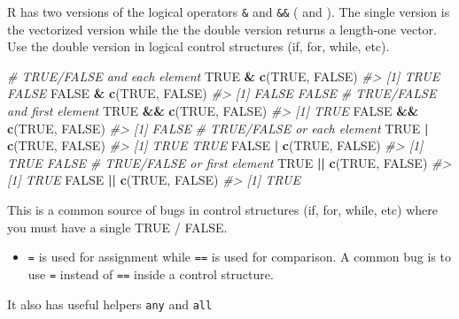 \documentclass[]{book}
\newenvironment{Shaded}{\begin{snugshade}}{\end{snugshade}}
\newcommand{\KeywordTok}[1]{\textcolor[rgb]{0.13,0.29,0.53}{\textbf{#1}}}
\newcommand{\StringTok}[1]{\textcolor[rgb]{0.31,0.60,0.02}{#1}}
\newcommand{\CommentTok}[1]{\textcolor[rgb]{0.56,0.35,0.01}{\textit{#1}}}
\newcommand{\OtherTok}[1]{\textcolor[rgb]{0.56,0.35,0.01}{#1}}
\newcommand{\OperatorTok}[1]{\textcolor[rgb]{0.81,0.36,0.00}{\textbf{#1}}}
\newcommand{\NormalTok}[1]{#1}
\newenvironment{rmdblock}[1]
  {\begin{shaded*}
  \begin{itemize}
  \renewcommand{\labelitemi}{
    \raisebox{-.7\height}[0pt][0pt]{
      {\setkeys{Gin}{width=3em,keepaspectratio}\texttt{[image: images/\#1]}}
    }
  }
  \item
  }
  {
  \end{itemize}
  \end{shaded*}
  }
\newenvironment{rmdcaution}
  {\begin{rmdblock}{caution}}
  {\end{rmdblock}}
\theoremstyle{definition}
\theoremstyle{definition}
\theoremstyle{definition}
\theoremstyle{remark}
\begin{document}
R has two versions of the logical operators \texttt{\&} and
\texttt{\&\&} (\texttt{\textbar{}} and \texttt{\textbar{}\textbar{}}).
The single version is the vectorized version while the the double
version returns a length-one vector. Use the double version in logical
control structures (if, for, while, etc).

\begin{Shaded}
\begin{Highlighting}[]
\CommentTok{# TRUE/FALSE and each element}
\OtherTok{TRUE} \OperatorTok{&}\StringTok{ }\KeywordTok{c}\NormalTok{(}\OtherTok{TRUE}\NormalTok{, }\OtherTok{FALSE}\NormalTok{)}
\CommentTok{#> [1]  TRUE FALSE}
\OtherTok{FALSE} \OperatorTok{&}\StringTok{ }\KeywordTok{c}\NormalTok{(}\OtherTok{TRUE}\NormalTok{, }\OtherTok{FALSE}\NormalTok{)}
\CommentTok{#> [1] FALSE FALSE}
\CommentTok{# TRUE/FALSE and first element}
\OtherTok{TRUE} \OperatorTok{&&}\StringTok{ }\KeywordTok{c}\NormalTok{(}\OtherTok{TRUE}\NormalTok{, }\OtherTok{FALSE}\NormalTok{)}
\CommentTok{#> [1] TRUE}
\OtherTok{FALSE} \OperatorTok{&&}\StringTok{ }\KeywordTok{c}\NormalTok{(}\OtherTok{TRUE}\NormalTok{, }\OtherTok{FALSE}\NormalTok{)}
\CommentTok{#> [1] FALSE}
\CommentTok{# TRUE/FALSE or each element}
\OtherTok{TRUE} \OperatorTok{|}\StringTok{ }\KeywordTok{c}\NormalTok{(}\OtherTok{TRUE}\NormalTok{, }\OtherTok{FALSE}\NormalTok{)}
\CommentTok{#> [1] TRUE TRUE}
\OtherTok{FALSE} \OperatorTok{|}\StringTok{ }\KeywordTok{c}\NormalTok{(}\OtherTok{TRUE}\NormalTok{, }\OtherTok{FALSE}\NormalTok{)}
\CommentTok{#> [1]  TRUE FALSE}
\CommentTok{# TRUE/FALSE or first element}
\OtherTok{TRUE} \OperatorTok{||}\StringTok{ }\KeywordTok{c}\NormalTok{(}\OtherTok{TRUE}\NormalTok{, }\OtherTok{FALSE}\NormalTok{)}
\CommentTok{#> [1] TRUE}
\OtherTok{FALSE} \OperatorTok{||}\StringTok{ }\KeywordTok{c}\NormalTok{(}\OtherTok{TRUE}\NormalTok{, }\OtherTok{FALSE}\NormalTok{)}
\CommentTok{#> [1] TRUE}
\end{Highlighting}
\end{Shaded}

This is a common source of bugs in control structures (if, for, while,
etc) where you must have a single TRUE / FALSE.

\begin{rmdcaution}
\texttt{=} is used for assignment while \texttt{==} is used for
comparison. A common bug is to use \texttt{=} instead of \texttt{==}
inside a control structure.
\end{rmdcaution}

It also has useful helpers \texttt{any} and \texttt{all}
\end{document}
